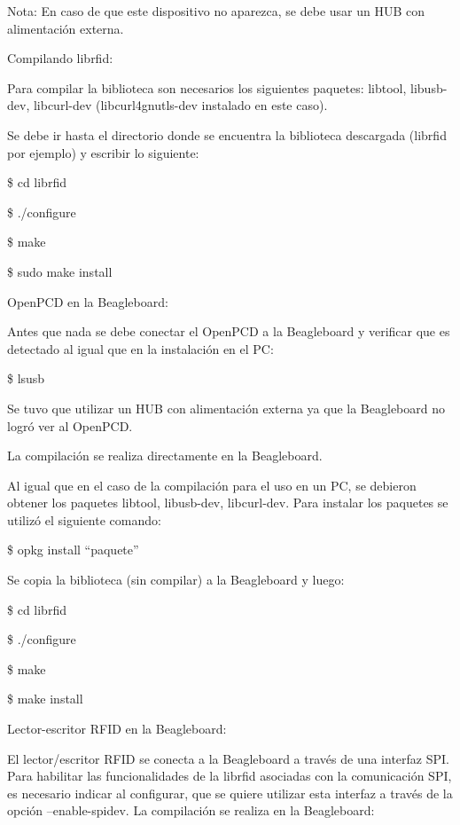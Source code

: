 \bigskip
Nota: En caso de que este dispositivo no aparezca, se debe usar un HUB con alimentación externa.

\bigskip
Compilando librfid:

\bigskip
Para compilar la biblioteca son necesarios los siguientes paquetes: libtool, libusb-dev, libcurl-dev (libcurl4gnutls-dev instalado en este caso).

\bigskip
Se debe ir hasta el directorio donde se encuentra la biblioteca descargada (librfid por ejemplo) y escribir lo siguiente:

\bigskip
\centerline{\$ cd librfid}

\centerline{\$ ./configure}

\centerline{\$ make}

\centerline{\$ sudo make install}


\bigskip
OpenPCD en la Beagleboard:

\bigskip
Antes que nada se debe conectar el OpenPCD a la Beagleboard y verificar que es detectado al igual que en la instalación en el PC:

\bigskip
\centerline{\$ lsusb}

\bigskip
Se tuvo que utilizar un HUB con alimentación externa ya que la Beagleboard no logró ver al OpenPCD.

\bigskip
La compilación se realiza directamente en la Beagleboard.

\bigskip
Al igual que en el caso de la compilación para el uso en un PC, se debieron obtener los paquetes libtool, libusb-dev, libcurl-dev. Para instalar los paquetes se utilizó el siguiente comando:

\bigskip
\centerline{\$ opkg install “paquete”}
 
\bigskip
Se copia la biblioteca (sin compilar) a la Beagleboard y luego:

\bigskip
\centerline{\$ cd librfid}

\centerline{\$ ./configure}

\centerline{\$ make}

\centerline{\$ make install}


\bigskip
Lector-escritor RFID en la Beagleboard:

\bigskip
El lector/escritor RFID se conecta a la Beagleboard a través de una interfaz SPI.
Para habilitar las funcionalidades de la librfid asociadas con la comunicación SPI, es necesario indicar al configurar, que se quiere utilizar esta interfaz a través de la opción --enable-spidev. La compilación se realiza en la Beagleboard:

